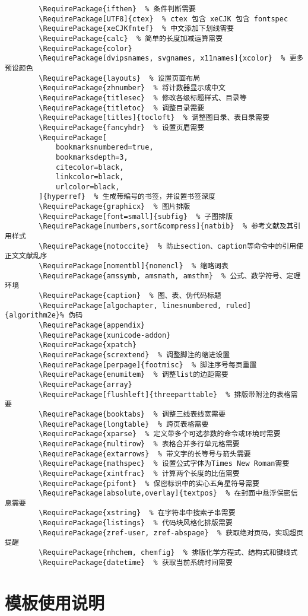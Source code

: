 \documentclass[doctor, vlined]{DissertUESTC}
\begin{document}
	\begin{verbatim}
		\RequirePackage{ifthen}  % 条件判断需要
		\RequirePackage[UTF8]{ctex}  % ctex 包含 xeCJK 包含 fontspec
		\RequirePackage{xeCJKfntef}  % 中文添加下划线需要
		\RequirePackage{calc}  % 简单的长度加减运算需要
		\RequirePackage{color}
		\RequirePackage[dvipsnames, svgnames, x11names]{xcolor}  % 更多预设颜色
		\RequirePackage{layouts}  % 设置页面布局
		\RequirePackage{zhnumber}  % 将计数器显示成中文
		\RequirePackage{titlesec}  % 修改各级标题样式、目录等
		\RequirePackage{titletoc}  % 调整目录需要
		\RequirePackage[titles]{tocloft}  % 调整图目录、表目录需要
		\RequirePackage{fancyhdr}  % 设置页眉需要
		\RequirePackage[
			bookmarksnumbered=true,
			bookmarksdepth=3,
			citecolor=black,
			linkcolor=black,
			urlcolor=black,
		]{hyperref}  % 生成带编号的书签，并设置书签深度
		\RequirePackage{graphicx}  % 图片排版
		\RequirePackage[font=small]{subfig}  % 子图排版
		\RequirePackage[numbers,sort&compress]{natbib}  % 参考文献及其引用样式
		\RequirePackage{notoccite}  % 防止section、caption等命令中的引用使正文文献乱序
		\RequirePackage[nomentbl]{nomencl}  % 缩略词表
		\RequirePackage{amssymb, amsmath, amsthm}  % 公式、数学符号、定理环境
		\RequirePackage{caption}  % 图、表、伪代码标题
		\RequirePackage[algochapter, linesnumbered, ruled]{algorithm2e}% 伪码
		\RequirePackage{appendix}
		\RequirePackage{xunicode-addon}
		\RequirePackage{xpatch}
		\RequirePackage{scrextend}  % 调整脚注的缩进设置
		\RequirePackage[perpage]{footmisc}  % 脚注序号每页重置
		\RequirePackage{enumitem}  % 调整list的边距需要
		\RequirePackage{array}
		\RequirePackage[flushleft]{threeparttable}  % 排版带附注的表格需要
		\RequirePackage{booktabs}  % 调整三线表线宽需要
		\RequirePackage{longtable}  % 跨页表格需要
		\RequirePackage{xparse}  % 定义带多个可选参数的命令或环境时需要
		\RequirePackage{multirow}  % 表格合并多行单元格需要
		\RequirePackage{extarrows}  % 带文字的长等号与箭头需要
		\RequirePackage{mathspec}  % 设置公式字体为Times New Roman需要
		\RequirePackage{xintfrac}  % 计算两个长度的比值需要
		\RequirePackage{pifont}  % 保密标识中的实心五角星符号需要
		\RequirePackage[absolute,overlay]{textpos}  % 在封面中悬浮保密信息需要
		\RequirePackage{xstring}  % 在字符串中搜索子串需要
		\RequirePackage{listings}  % 代码块风格化排版需要
		\RequirePackage{zref-user, zref-abspage}  % 获取绝对页码，实现超页提醒
		\RequirePackage{mhchem, chemfig}  % 排版化学方程式、结构式和键线式
		\RequirePackage{datetime}  % 获取当前系统时间需要
	\end{verbatim}
	

	\chapter{模板使用说明}
\end{document}
